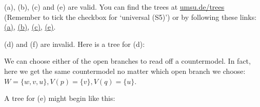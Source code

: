\begin{solution}
  (a), (b), (c) and (e) are valid. You can find the trees at
  \href{https://www.umsu.de/trees/}{umsu.de/trees} (Remember to tick the checkbox for `universal (S5)') or by following these links:
  \href{https://www.umsu.de/trees/#p~5~8~9p||universality}{(a)},
\href{https://www.umsu.de/trees/#~9~9p~5~9p||universality}{(b)},
\href{https://www.umsu.de/trees/#~9(p~1q)~5(~9p~1~9q)||universality}{(c)},
\href{https://www.umsu.de/trees/#~9(p~2q)~4(~9p~2~9q)||universality}{(e)}.
  
  (d) and (f) are invalid. Here is a tree for (d):

  \medskip

  \medskip\noindent
  We can choose either of the open branches to read off a countermodel. In fact, here we get the same countermodel no matter which open branch we choose:
$W = \{ w,v,u \}, V(p)=\{ v\}, V(q)=\{u\}$.
  \medskip

  A tree for (e) might begin like this:


\end{solution}
